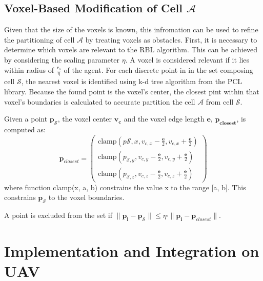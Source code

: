         \subsection{Voxel-Based Modification of Cell $\mathcal{A}$}
            Given that the size of the voxels is known, this infromation can be used to refine the partitioning of cell $\mathcal{A}$ by treating voxels as obstacles.
            First, it is necessary to determine which voxels are relevant to the \ac{RBL} algorithm.
            This can be achieved by considering the scaling parameter $\eta$.
            A voxel is considered relevant if it lies within radius of $\frac{r_s}{\eta}$ of the agent.
            For each discrete point in  in the set composing cell $\mathcal{S}$, the nearest voxel is identified using k-d tree algorithm from the PCL library.
            Because the found point is the voxel's center, the closest pint within that voxel's boundaries is calculated to accurate partition the cell $\mathcal{A}$ from cell $\mathcal{S}$.

            Given a point $\mathbf{p_{\mathcal{S}}}$, the voxel center $\mathbf{v_c}$ and the voxel edge length $\mathbf{e}$, $\mathbf{p_{closest}}$, is computed as: 
            \begin{equation}
                \mathbf{p}_{closest} =
                \begin{pmatrix}
                    \text{clamp}(p{\mathcal{S},x}, v_{c,x} - \frac{\mathbf{e}}{2}, v_{c,x} + \frac{\mathbf{e}}{2}) \\
                    \text{clamp}(p_{\mathcal{S},y}, v_{c,y} - \frac{\mathbf{e}}{2}, v_{c,y} + \frac{\mathbf{e}}{2}) \\
                    \text{clamp}(p_{\mathcal{S},z}, v_{c,z} - \frac{\mathbf{e}}{2}, v_{c,z} + \frac{\mathbf{e}}{2})
                \end{pmatrix}
            \end{equation}
            where function clamp(x, a, b) constrains the value x to the range [a, b].
            This constrains $\mathbf{p_{\mathcal{S}}}$ to the voxel boundaries.

            A point is excluded from the set if $ \| \mathbf{p_i} - \mathbf{p_{\mathcal{S}}} \| \leq \eta \cdot \| \mathbf{p_i} - \mathbf{p}_{closest}\|$.
            

    \section{Implementation and Integration on UAV}
